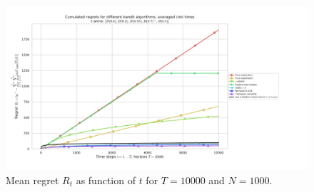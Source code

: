 \begin{figure}[h!]  %
	\includegraphics[width=1.12\linewidth]{SP__K5_T10000_N1000__7_algos/main____env1-1_2506036032481767447.pdf}
	\caption{Mean regret $R_t$ as function of $t$ for $T=10000$ and $N=1000$.}
	\label{fig:2:meanRegretAsFunctionOfTimeForDifferentAlgorithmsT10000N1000}
\end{figure}






